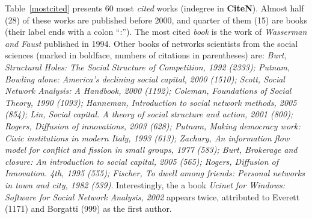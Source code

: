 \documentclass[11pt]{article} %
\begin{document}
Table~\ref{mostcited} presents 60 most \textit{cited} works (indegree in \textbf{CiteN}). Almost half (28) of these works are published before 2000, and quarter of them (15) are books (their label ends with a colon ``:''). The most cited \textit{book} is the work of \textit{Wasserman and Faust} published in 1994. Other books of networks scientists from the social sciences (marked in boldface, numbers of citations in parentheses) are: \textit{Burt, Structural Holes: The Social Structure of Competition, 1992 (2333); Putnam, Bowling alone: America’s declining social capital, 2000 (1510); Scott, Social Network Analysis: A Handbook, 2000 (1192);  Coleman, Foundations of Social Theory, 1990 (1093); Hanneman, Introduction to social network methods, 2005 (854); Lin, Social capital. A theory of social structure and action, 2001 (800); Rogers, Diffusion of innovations, 2003 (628); Putnam, Making democracy work: Civic institutions in modern Italy, 1993 (613); Zachary, An information flow model for conflict and fission in small groups, 1977 (583); Burt, Brokerage and closure: An introduction to social capital, 2005 (565);  Rogers, Diffusion of Innovation. 4th, 1995 (555);  Fischer, To dwell among friends: Personal networks in town and city, 1982 (539)}. Interestingly, the a book \textit{Ucinet for Windows: Software for Social Network Analysis, 2002} appears twice, attributed to Everett (1171) and Borgatti (999) as the first author. \medskip 
\end{document}
